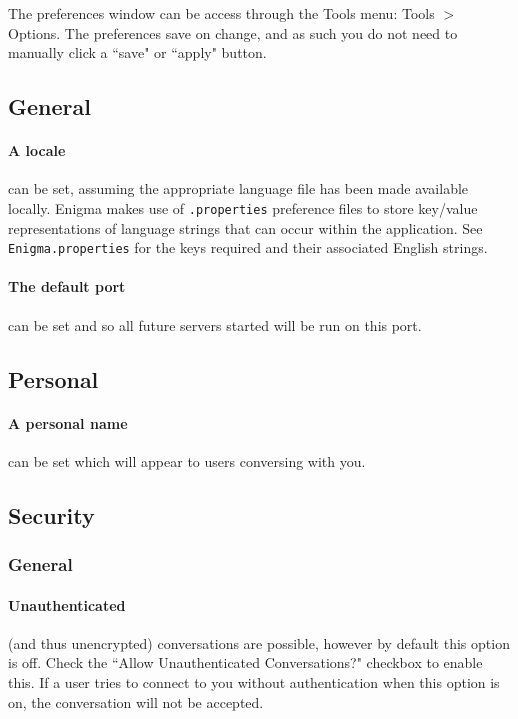 The preferences window can be access through the Tools menu: Tools $>$ Options. The preferences save on change, and as such you do not need to manually click a ``save" or ``apply" button.

  \subsection{General}
  
    \paragraph{A locale} can be set, assuming the appropriate language file has been made available locally. Enigma makes use of \verb!.properties! preference files to store key/value representations of language strings that can occur within the application. See \verb!Enigma.properties! for the keys required and their associated English strings.
    
    \paragraph{The default port} can be set and so all future servers started will be run on this port.
  
  \subsection{Personal}
  
    \paragraph{A personal name} can be set which will appear to users conversing with you.
  
  \subsection{Security}
  
  \subsubsection{General}
  
    \paragraph{Unauthenticated} (and thus unencrypted) conversations are possible, however by default this option is off. Check the ``Allow Unauthenticated Conversations?" checkbox to enable this. If a user tries to connect to you without authentication when this option is on, the conversation will not be accepted.
    
